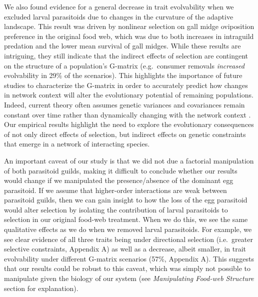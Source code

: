 \documentclass[11pt,]{article}
\begin{document}
We also found evidence for a general decrease in trait evolvability when
we excluded larval parasitoids due to changes in the curvature of the
adaptive landscape. This result was driven by nonlinear selection on
gall midge oviposition preference in the original food web, which was
due to both increases in intraguild predation and the lower mean
survival of gall midges. While these results are intriguing, they still
indicate that the indirect effects of selection are contingent on the
structure of a population's G-matrix (e.g.~consumer removals
\emph{increased} evolvability in 29\% of the scenarios). This highlights
the importance of future studies to characterize the G-matrix in order
to accurately predict how changes in network context will alter the
evolutionary potential of remaining populations. Indeed, current theory
often assumes genetic variances and covariances remain constant over
time rather than dynamically changing with the network context
\citep{McPeek2017, Guimaraes2017}. Our empirical results highlight the
need to explore the evolutionary consequences of not only direct effects
of selection, but indirect effects on genetic constraints that emerge in
a network of interacting species.

An important caveat of our study is that we did not due a factorial
manipulation of both parasitoid guilds, making it difficult to conclude
whether our results would change if we manipulated the presence/absence
of the dominant egg parasitoid. If we assume that higher-order
interactions \citep{Levine2017} are weak between parasitoid guilds, then
we can gain insight to how the loss of the egg parasitoid would alter
selection by isolating the contribution of larval parasitoids to
selection in our original food-web treatment. When we do this, we see
the same qualitative effects as we do when we removed larval
parasitoids. For example, we see clear evidence of all three traits
being under directional selection (i.e.~greater selective constraints,
Appendix A) as well as a decrease, albeit smaller, in trait evolvability
under different G-matrix scenarios (57\%, Appendix A). This suggests
that our results could be robust to this caveat, which was simply not
possible to manipulate given the biology of our system (see
\emph{Manipulating Food-web Structure} section for explanation).
\end{document}

